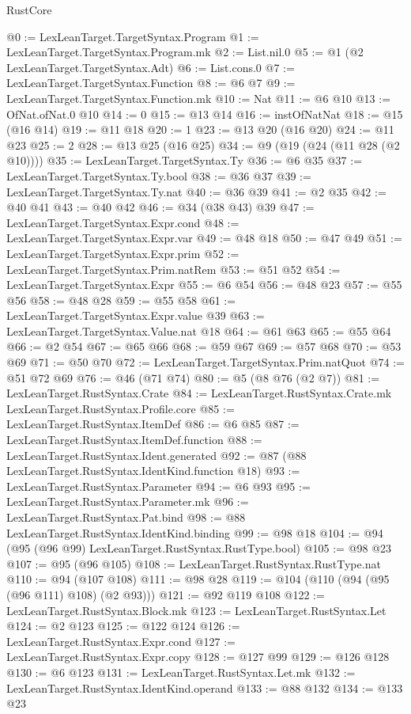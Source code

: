 \begin{lexlean}{RustCore}
\begin{coremodule}
@0 := LexLeanTarget.TargetSyntax.Program
@1 := LexLeanTarget.TargetSyntax.Program.mk
@2 := List.nil.{0}
@5 := @1 (@2 LexLeanTarget.TargetSyntax.Adt)
@6 := List.cons.{0}
@7 := LexLeanTarget.TargetSyntax.Function
@8 := @6 @7
@9 := LexLeanTarget.TargetSyntax.Function.mk
@10 := Nat
@11 := @6 @10
@13 := OfNat.ofNat.{0} @10
@14 := 0
@15 := @13 @14
@16 := instOfNatNat
@18 := @15 (@16 @14)
@19 := @11 @18
@20 := 1
@23 := @13 @20 (@16 @20)
@24 := @11 @23
@25 := 2
@28 := @13 @25 (@16 @25)
@34 := @9 (@19 (@24 (@11 @28 (@2 @10))))
@35 := LexLeanTarget.TargetSyntax.Ty
@36 := @6 @35
@37 := LexLeanTarget.TargetSyntax.Ty.bool
@38 := @36 @37
@39 := LexLeanTarget.TargetSyntax.Ty.nat
@40 := @36 @39
@41 := @2 @35
@42 := @40 @41
@43 := @40 @42
@46 := @34 (@38 @43) @39
@47 := LexLeanTarget.TargetSyntax.Expr.cond
@48 := LexLeanTarget.TargetSyntax.Expr.var
@49 := @48 @18
@50 := @47 @49
@51 := LexLeanTarget.TargetSyntax.Expr.prim
@52 := LexLeanTarget.TargetSyntax.Prim.natRem
@53 := @51 @52
@54 := LexLeanTarget.TargetSyntax.Expr
@55 := @6 @54
@56 := @48 @23
@57 := @55 @56
@58 := @48 @28
@59 := @55 @58
@61 := LexLeanTarget.TargetSyntax.Expr.value @39
@63 := LexLeanTarget.TargetSyntax.Value.nat @18
@64 := @61 @63
@65 := @55 @64
@66 := @2 @54
@67 := @65 @66
@68 := @59 @67
@69 := @57 @68
@70 := @53 @69
@71 := @50 @70
@72 := LexLeanTarget.TargetSyntax.Prim.natQuot
@74 := @51 @72 @69
@76 := @46 (@71 @74)
@80 := @5 (@8 @76 (@2 @7))
@81 := LexLeanTarget.RustSyntax.Crate
@84 := LexLeanTarget.RustSyntax.Crate.mk LexLeanTarget.RustSyntax.Profile.core
@85 := LexLeanTarget.RustSyntax.ItemDef
@86 := @6 @85
@87 := LexLeanTarget.RustSyntax.ItemDef.function
@88 := LexLeanTarget.RustSyntax.Ident.generated
@92 := @87 (@88 LexLeanTarget.RustSyntax.IdentKind.function @18)
@93 := LexLeanTarget.RustSyntax.Parameter
@94 := @6 @93
@95 := LexLeanTarget.RustSyntax.Parameter.mk
@96 := LexLeanTarget.RustSyntax.Pat.bind
@98 := @88 LexLeanTarget.RustSyntax.IdentKind.binding
@99 := @98 @18
@104 := @94 (@95 (@96 @99) LexLeanTarget.RustSyntax.RustType.bool)
@105 := @98 @23
@107 := @95 (@96 @105)
@108 := LexLeanTarget.RustSyntax.RustType.nat
@110 := @94 (@107 @108)
@111 := @98 @28
@119 := @104 (@110 (@94 (@95 (@96 @111) @108) (@2 @93)))
@121 := @92 @119 @108
@122 := LexLeanTarget.RustSyntax.Block.mk
@123 := LexLeanTarget.RustSyntax.Let
@124 := @2 @123
@125 := @122 @124
@126 := LexLeanTarget.RustSyntax.Expr.cond
@127 := LexLeanTarget.RustSyntax.Expr.copy
@128 := @127 @99
@129 := @126 @128
@130 := @6 @123
@131 := LexLeanTarget.RustSyntax.Let.mk
@132 := LexLeanTarget.RustSyntax.IdentKind.operand
@133 := @88 @132
@134 := @133 @23

\end{coremodule}
\end{lexlean}
